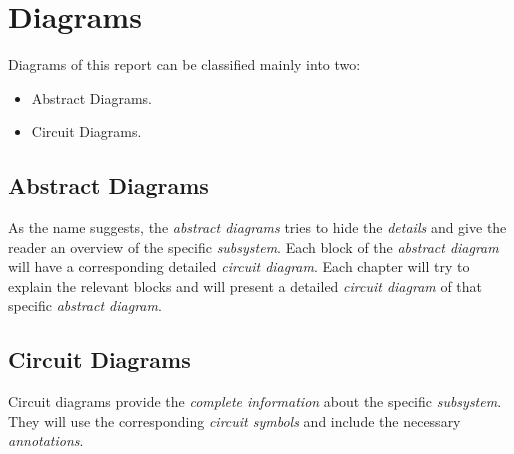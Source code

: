 \documentclass[../../main]{subfiles}
\begin{document}
\section{Diagrams} \label{sec:}

Diagrams of this report can be classified mainly into two:

\begin{itemize}

    \item Abstract Diagrams.
    \item Circuit Diagrams.

\end{itemize}

\subsection{Abstract Diagrams}

As the name suggests, the \emph{abstract diagrams} tries to hide the \emph{details}
and give the reader an overview of the specific \emph{subsystem}. Each block of the
\emph{abstract diagram} will have a corresponding detailed \emph{circuit diagram}.
Each chapter will try to explain the relevant blocks and will present a detailed
\emph{circuit diagram} of that specific \emph{abstract diagram}.

\subsection{Circuit Diagrams}

Circuit diagrams provide the \emph{complete information} about the specific \emph{subsystem}.
They will use the corresponding \emph{circuit symbols} and include the necessary \emph{annotations}.
\end{document}
